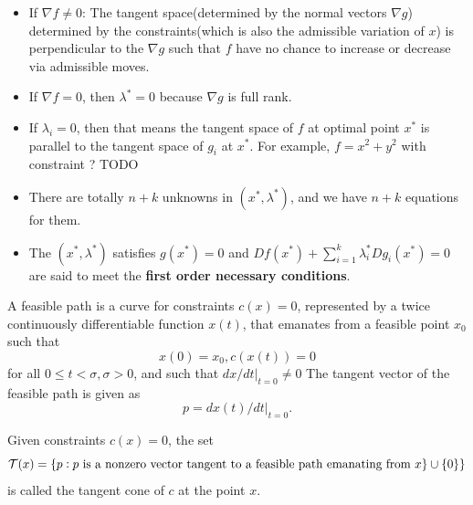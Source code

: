\begin{refsection}
\begin{remark}[intuition] \hfill
\begin{itemize}
 \item If $\nabla f \neq 0$: The tangent space(determined by the normal vectors $\nabla g$) determined by the constraints(which is also the admissible variation of $x$) is perpendicular to the $\nabla g$ such that $f$ have no chance to increase or decrease via admissible moves.
\item If $\nabla f = 0$, then $\lambda^* =0$ because $\nabla g$ is full rank.   
\item If $\lambda_i = 0$, then that means the tangent space of $f$ at optimal point $x^*$ is parallel to the tangent space of $g_i$ at $x^*$. For example, $f=x^2 + y^2$ with constraint ? TODO
\end{itemize}
\end{remark}

\begin{remark}

\end{remark}


\begin{remark}\hfill
\begin{itemize}
    \item There are totally $n+k$ unknowns in $(x^*,\lambda^*)$, and we have $n+k$ equations for them.
    \item The $(x^*,\lambda^*)$ satisfies $g(x^*) = 0$ and $Df(x^*) + \sum_{i=1}^k \lambda^*_i Dg_i(x^*) = 0$ are said to meet the \textbf{first order necessary conditions}.
\end{itemize}
\end{remark}

\fi


\begin{definition}
\cite[lec 4]{Robinson2015nonlinear2}A feasible path is a curve for constraints $c(x) = 0$, represented by a twice continuously differentiable function $x(t)$, that emanates from a feasible point $x_0$ such that
$$x(0)=x_0,c(x(t)) = 0$$
for all $0\leq t <\sigma, \sigma > 0$, and such that 
$dx/dt|_{t=0}\neq 0$
The tangent vector of the feasible path is given as 
$$p= dx(t)/dt|_{t=0}.$$
\end{definition}


\begin{definition}
\cite[lec 4]{Robinson2015nonlinear2}Given constraints $c(x) = 0$, the set
$$\mathcal{T}(x) = \{p:p ~\text{is a nonzero vector tangent to a feasible path emanating from } x\} \cup \{0\}\}$$
is called the tangent cone of $c$ at the point $x$.
\end{definition}


\end{refsection}
